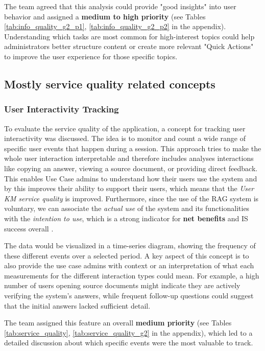 \documentclass[
	english,
	ruledheaders=section,%
	class=report,%
	thesis={type=bachelor},%
	accentcolor=1b,%
	custommargins=true,%
	marginpar=false,%
	parskip=half-,%
	fontsize=11pt,%
	DIV=14,
]{tudapub}
\begin{document}
The team agreed that this analysis could provide "good insights" into user behavior and assigned a \textbf{medium to high priority} (see Tables \ref{tab:info_quality_g2_p1}, \ref{tab:info_quality_g2_p2} in the appendix). Understanding which tasks are most common for high-interest topics could help administrators better structure content or create more relevant "Quick Actions" to improve the user experience for those specific topics.
\subsection{Mostly service quality related concepts}
\subsubsection{User Interactivity Tracking}
To evaluate the service quality \parencite[p.~18]{DeloneMcLean2003ISSuccessTenYearUpdate} of the application, a concept for tracking user interactivity was discussed. The idea is to monitor and count a wide range of specific user events that happen during a session. This approach tries to make the whole user interaction interpretable and therefore includes analyses interactions like copying an answer, viewing a source document, or providing direct feedback. This enables Use Case admins to understand how their users use the system and by this improves their ability to support their users, which means that the \textit{User KM service quality} \parencite[pp.~58--59]{Jennex2006} is improved. Furthermore, since the use of the RAG system is voluntary, we can associate the \textit{actual use} of the system and its functionalities with the \textit{intention to use}, which is a strong indicator for \textbf{net benefits} and IS success overall \parencite[pp.~23--24]{DeloneMcLean2003ISSuccessTenYearUpdate}.

The data would be visualized in a time-series diagram, showing the frequency of these different events over a selected period. A key aspect of this concept is to also provide the use case admins with context or an interpretation of what each measurements for the different interaction types could mean. For example, a high number of users opening source documents might indicate they are actively verifying the system's answers, while frequent follow-up questions could suggest that the initial answers lacked sufficient detail.

The team assigned this feature an overall \textbf{medium priority} (see Tables \ref{tab:service_quality}, \ref{tab:service_quality_g2} in the appendix), which led to a detailed discussion about which specific events were the most valuable to track.
\end{document}
